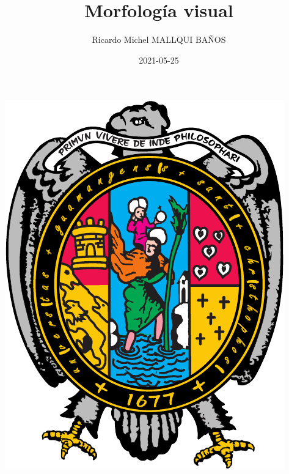 \documentclass[
  16pt,
]{krantz}
\title{Morfología visual}
\author{Ricardo Michel MALLQUI BAÑOS}
\date{2021-05-25}
\let\oldincludegraphics\includegraphics
\renewcommand\includegraphics[2][]{%
  \oldincludegraphics[scale=0.85]{#2}
}
\theoremstyle{definition}
\theoremstyle{definition}
\theoremstyle{definition}
\theoremstyle{definition}
\theoremstyle{remark}
\begin{document}
\maketitle

\thispagestyle{empty}
\begin{center}
\includegraphics{U.pdf}
\end{center}


{
\hypersetup{linkcolor=}
\setcounter{tocdepth}{2}
\tableofcontents
}
\listoftables
\listoffigures
\newcommand{\N}{\mathbb{N}}
\newcommand{\R}{\mathbb{R}}
\newcommand{\CC}{\mathbb{C}}
\newcommand{\I}{\mathbb{I}}
\newcommand{\f}{\mathbb{f}}
\newcommand{\X}{\mathbb{X}}
\newcommand{\D}{\mathbb{D}}
\newcommand{\Z}{\mathbb{Z}}
\newcommand{\Q}{\mathbb{Q}}
\newcommand{\norm}[1]{\left\Vert#1\right\Vert}
\newcommand{\abs}[1]{\left\vert#1\right\vert}
\newcommand{\set}[1]{\left\{#1\right\}}
\newcommand{\seq}[1]{\left<#1\right>}
\newcommand{\co}[1]{\left[#1\right]}
\newcommand{\cc}[1]{\left(#1\right)}
\newcommand{\J}{\mathcal{J}}
\newcommand{\K}{\mathcal{K}}
\newcommand{\M}{\mathcal{M}}
\newcommand{\F}{\mathcal{F}}
\end{document}
